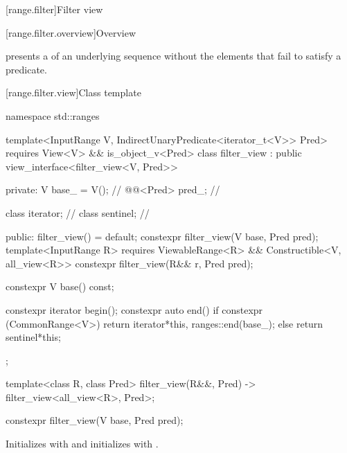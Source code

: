 [range.filter]{Filter view}

[range.filter.overview]{Overview}

\pnum
{} presents a  of an underlying sequence
without the elements that fail to satisfy a predicate.

\pnum
\begin{example}
\end{example}

[range.filter.view]{Class template }

\begin{codeblock}
namespace std::ranges {
  template<InputRange V, IndirectUnaryPredicate<iterator_t<V>> Pred>
    requires View<V> && is_object_v<Pred>
  class filter_view : public view_interface<filter_view<V, Pred>> {
  private:
    V base_ = V();              // \expos
    @@<Pred> pred_;    // \expos

    class iterator;             // \expos
    class sentinel;             // \expos

  public:
    filter_view() = default;
    constexpr filter_view(V base, Pred pred);
    template<InputRange R>
      requires ViewableRange<R> && Constructible<V, all_view<R>>
    constexpr filter_view(R&& r, Pred pred);

    constexpr V base() const;

    constexpr iterator begin();
    constexpr auto end() {
      if constexpr (CommonRange<V>)
        return iterator{*this, ranges::end(base_)};
      else
        return sentinel{*this};
    }
  };

  template<class R, class Pred>
    filter_view(R&&, Pred) -> filter_view<all_view<R>, Pred>;
}
\end{codeblock}

%
\begin{itemdecl}
constexpr filter_view(V base, Pred pred);
\end{itemdecl}

\begin{itemdescr}
\pnum
\effects Initializes  with  and initializes
 with .
\end{itemdescr}

